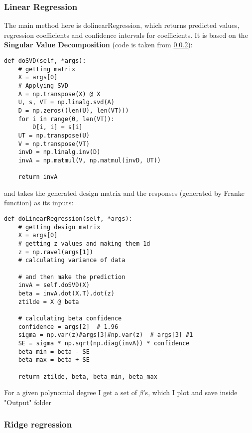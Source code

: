 \subsubsection{Linear Regression}
The main method here is dolinearRegression, which returns predicted values, regression coefficients and confidence intervals for coefficients. It is based on the \textbf{Singular Value Decomposition} (code is taken from \ref{}):
\begin{lstlisting}
def doSVD(self, *args):
    # getting matrix
    X = args[0]
    # Applying SVD
    A = np.transpose(X) @ X
    U, s, VT = np.linalg.svd(A)
    D = np.zeros((len(U), len(VT)))
    for i in range(0, len(VT)):
        D[i, i] = s[i]
    UT = np.transpose(U)
    V = np.transpose(VT)
    invD = np.linalg.inv(D)
    invA = np.matmul(V, np.matmul(invD, UT))

    return invA
\end{lstlisting}
and takes the generated design matrix and the responses (generated by Franke function) as its inputs:
\begin{lstlisting}
def doLinearRegression(self, *args):
    # getting design matrix
    X = args[0]
    # getting z values and making them 1d
    z = np.ravel(args[1])
    # calculating variance of data

    # and then make the prediction
    invA = self.doSVD(X)
    beta = invA.dot(X.T).dot(z)
    ztilde = X @ beta

    # calculating beta confidence
    confidence = args[2]  # 1.96
    sigma = np.var(z)#args[3]#np.var(z)  # args[3] #1
    SE = sigma * np.sqrt(np.diag(invA)) * confidence
    beta_min = beta - SE
    beta_max = beta + SE

    return ztilde, beta, beta_min, beta_max
\end{lstlisting}
For a given polynomial degree I get a set of $\beta$'s, which I plot and save inside "Output" folder

\subsubsection{Ridge regression}

